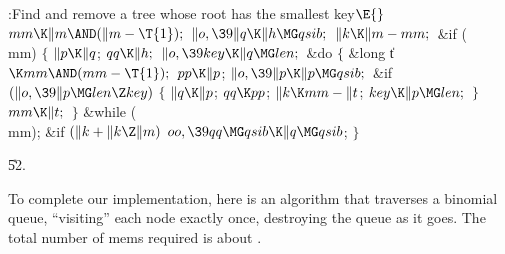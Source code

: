 \Y\B\4:Find and remove a tree whose root  has the smallest key\X${}%
\E{}$\6
$\\{mm}\K\|m\AND(\|m-\T{1});{}$\6
${}\|o,\39\|q\K\|h\MG\\{qsib};{}$\6
${}\|k\K\|m-\\{mm};{}$\6
\&{if} (\\{mm})\5
${}\{{}$\1\6
${}\|p\K\|q{}$;\5
${}\\{qq}\K\|h;{}$\6
${}\|o,\39\\{key}\K\|q\MG\\{len};{}$\6
\&{do}\5
${}\{{}$\5
\1\&{long} \|t${}\K\\{mm}\AND(\\{mm}-\T{1});{}$\7
${}\\{pp}\K\|p{}$;\5
${}\|o,\39\|p\K\|p\MG\\{qsib};{}$\6
\&{if} ${}(\|o,\39\|p\MG\\{len}\Z\\{key}){}$\5
${}\{{}$\1\6
${}\|q\K\|p{}$;\5
${}\\{qq}\K\\{pp}{}$;\5
${}\|k\K\\{mm}-\|t{}$;\5
${}\\{key}\K\|p\MG\\{len};{}$\6
\4${}\}{}$\2\6
${}\\{mm}\K\|t;{}$\6
\4${}\}{}$\5
\2\5
\&{while} (\\{mm});\6
\&{if} ${}(\|k+\|k\Z\|m){}$\1\5
${}\\{oo},\39\\{qq}\MG\\{qsib}\K\|q\MG\\{qsib}{}$;\2\6
\4${}\}{}$\2\par
\U52.\fi

To complete our implementation, here is an algorithm that traverses
a binomial queue, ``visiting'' each node exactly once, destroying the
queue as it goes. The total number of mems required is about .

